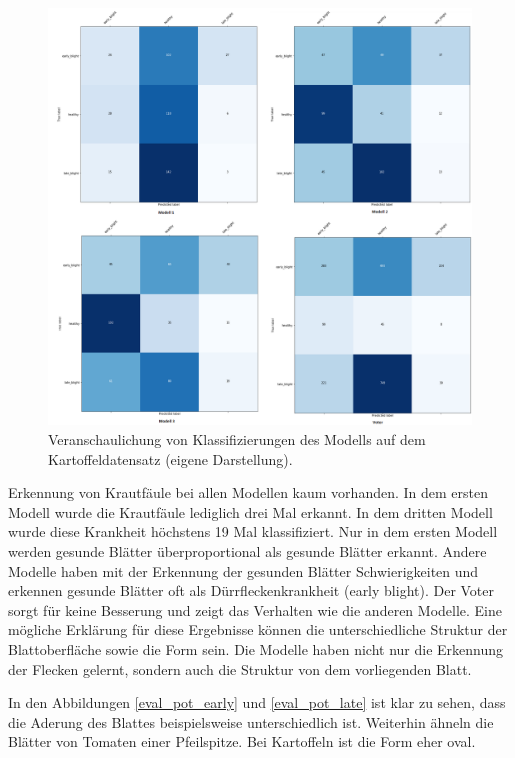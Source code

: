 \begin{figure}[h!]
	\centering
	\includegraphics[width=\textwidth]{potatoes_plots/combined.PNG}
	\caption{Veranschaulichung von Klassifizierungen des Modells auf dem Kartoffeldatensatz (eigene Darstellung).}
	\label{potatoes_combined}
\end{figure}

Erkennung von Krautfäule bei allen Modellen kaum vorhanden. In dem ersten Modell wurde die Krautfäule lediglich drei Mal erkannt. In dem dritten Modell wurde diese Krankheit höchstens 19 Mal klassifiziert. Nur in dem ersten Modell werden gesunde Blätter überproportional als gesunde Blätter erkannt. Andere Modelle haben mit der Erkennung der gesunden Blätter Schwierigkeiten und erkennen gesunde Blätter oft als Dürrfleckenkrankheit (early blight). Der Voter sorgt für keine Besserung und zeigt das Verhalten wie die anderen Modelle. Eine mögliche Erklärung für diese Ergebnisse können die unterschiedliche Struktur der Blattoberfläche sowie die Form sein. Die Modelle haben nicht nur die Erkennung der Flecken gelernt, sondern auch die Struktur von dem vorliegenden Blatt.

In den Abbildungen \ref{eval_pot_early} und \ref{eval_pot_late} ist klar zu sehen, dass die Aderung des Blattes beispielsweise unterschiedlich ist. Weiterhin ähneln die Blätter von Tomaten einer Pfeilspitze. Bei Kartoffeln ist die Form eher oval.


